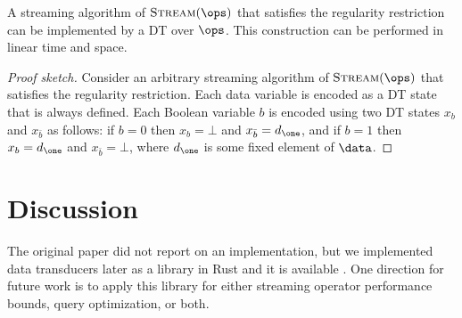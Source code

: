 \begin{theorem}
A streaming algorithm of $\Stream(\ops)$ that satisfies the regularity restriction can be implemented by a DT over $\ops$. This construction can be performed in linear time and space.
\end{theorem}
\begin{proof}[Proof sketch]
Consider an arbitrary streaming algorithm of $\Stream(\ops)$ that satisfies the regularity restriction. Each data variable is encoded as a DT state that is always defined. Each Boolean variable $b$ is encoded using two DT states $x_b$ and $x_{\bar b}$ as follows: if $b = 0$ then $x_b = \bot$ and $x_{\bar b} = d_\one$, and if $b = 1$ then $x_b = d_\one$ and $x_{\bar b} = \bot$, where $d_\one$ is some fixed element of $\data$.
\end{proof}


\section{Discussion}
\label{dt:sec:discussion}

The original paper did not report on an implementation, but we implemented data transducers later as a library in Rust
and it is available .
One direction for future work is to apply this library for either streaming operator performance bounds, query optimization, or both.

